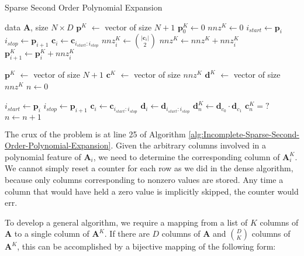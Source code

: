 \documentclass{article}
\begin{document}
\begin{algorithm}%
   \caption{Sparse Second Order Polynomial Expansion}
   \label{alg:Incomplete-Sparse-Second-Order-Polynomial-Expansion}
\begin{algorithmic}[1]
    data $\bm{A}$, size $N \times D$
   \STATE $\bm{p}^K$ $\gets$ vector of size $N+1$
   \STATE $\bm{p}^K_0 \gets 0$
   \STATE $nnz^K \gets 0$
      \STATE $i_{start} \gets \bm{p}_i$
      \STATE $i_{stop} \gets \bm{p}_{i+1}$
      \STATE $\bm{c}_i \gets \bm{c}_{i_{start}:i_{stop}}$
      \STATE $nnz^K_i \gets \binom{|\bm{c}_i|}{2}$ \label{li:row_nnz_count}
      \STATE $nnz^K \gets nnz^K + nnz^K_i$
      \STATE $\bm{p}^K_{i+1} \gets \bm{p}^K_i + nnz^K_i$
  \ENDFOR
  
  \STATE $\bm{p}^K$ $\gets$ vector of size $N+1$
  \STATE $\bm{c}^K$ $\gets$ vector of size $nnz^K$
  \STATE $\bm{d}^K$ $\gets$ vector of size $nnz^K$
  \STATE $n \gets 0$
  
      \STATE $i_{start} \gets \bm{p}_i$
      \STATE $i_{stop} \gets \bm{p}_{i+1}$
      \STATE $\bm{c}_i \gets \bm{c}_{i_{start}:i_{stop}}$
      \STATE $\bm{d}_i \gets \bm{d}_{i_{start}:i_{stop}}$
              \STATE $\bm{d}^K_{n} \gets \bm{d}_{c_0} \cdot \bm{d}_{c_1}$
              \STATE $\bm{c}^K_{n} = ?$ \label{li:set_ck}
              \STATE $n \gets n + 1$
          \ENDFOR
      \ENDFOR
  \ENDFOR
\end{algorithmic}
\end{algorithm}

The crux of the problem is at line 25 of Algorithm \ref{alg:Incomplete-Sparse-Second-Order-Polynomial-Expansion}.
Given the arbitrary columns involved in a polynomial feature of $\bm{A}_i$, we need to determine the corresponding column of $\bm{A}^K_i$.
We cannot simply reset a counter for each row as we did in the dense algorithm,  because only columns corresponding to nonzero values are stored.
Any time a column that would have held a zero value is implicitly skipped, the counter would err.

To develop a general algorithm, we require a mapping from a list of $K$ columns of $\bm{A}$ to a single column of $\bm{A}^K$.
If there are $D$ columns of $\bm{A}$ and $\binom{D}{K}$ columns of $\bm{A}^K$, this can be accomplished by a bijective mapping of the following form:
\end{document}
